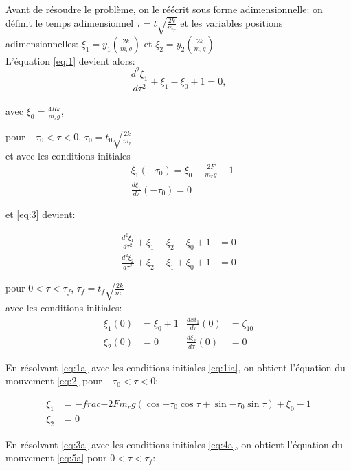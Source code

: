 Avant de résoudre le problème, on le réécrit sous forme adimensionnelle:
on définit le temps adimensionnel $\tau=t\sqrt{\frac{2k}{m_r}}$ et les variables positions adimensionnelles: $\xi_1=y_1 (\frac{2k}{m_r g})$ et $\xi_2=y_2 (\frac{2k}{m_r g})$ \\

 L'équation \ref{eq:1} devient alors:
\begin{equation}
    \frac{d^2\xi_1}{d\tau^2}+\xi_1-\xi_0+1=0,
  \label{eq:1a}
\end{equation}
\\
avec $\xi_0=\frac{4Rk}{m_r g}$,

pour $-\tau_0<\tau<0$, $\tau_0=t_0 \sqrt{\frac{2k}{m_r}}$\\

et avec les conditions initiales
\begin{align}
    &\xi_1(-\tau_0)=\xi_0-\frac{2F}{m_r g}-1 \nonumber\\
    &\frac{d\xi_1}{d\tau}(-\tau_0)=0
\label{eq:1ia}
\end{align}
 

et \ref{eq:3} devient:

\begin{align}
    \frac{d^2\xi_1}{d\tau^2}+\xi_1-\xi_2-\xi_0+1&=0 \nonumber\\
    \frac{d^2\xi_2}{d\tau^2}+\xi_2-\xi_1+\xi_0+1&=0
  \label{eq:3a}
\end{align}

pour $0<\tau<\tau_f$, $\tau_f=t_f \sqrt{\frac{2k}{m_r}}$ \\
avec les conditions initiales: 
\begin{align}
    \xi_1(0)&=\xi_0+1   &  \frac{d xi_1}{d\tau}(0)&=\zeta_{10} \nonumber\\
    \xi_2(0)&=0   &  \frac{d \xi_2}{d\tau}(0)&=0
  \label{eq:4a}
\end{align} 

En résolvant \ref{eq:1a} avec les conditions initiales \ref{eq:1ia}, on obtient l'équation du mouvement \ref{eq:2} pour $-\tau_0<\tau<0$:

\begin{align}
    \xi_1&=-frac{-2F}{m_r g}(\cos{-\tau_0}\cos{\tau}+\sin{-\tau_0}\sin{\tau})+\xi_0-1 \nonumber\\
    \xi_2&=0
  \label{eq:2}
\end{align}

En résolvant \ref{eq:3a} avec les conditions initiales \ref{eq:4a}, on obtient l'équation du mouvement \ref{eq:5a} pour $0<\tau<\tau_f$:

